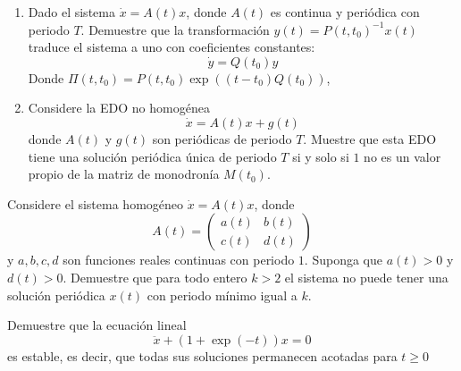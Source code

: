 \documentclass{homework}
\begin{document}
\begin{sol}
    
\end{sol}

\begin{prob}
    \begin{enumerate}[label=(\alph*)]
        \item Dado el sistema \(\dot{x}=A(t)x\), donde \(A(t)\) es continua y periódica con periodo \(T\). Demuestre que la transformación \(y(t)=P(t,t_0)^{-1}x(t)\) traduce el sistema a uno con coeficientes constantes:
        \[\dot{y}=Q(t_0)y\]
        Donde \(\Pi(t,t_0)=P(t,t_0)\exp((t-t_0)Q(t_0))\), 
        \item Considere la EDO no homogénea
        \[\dot{x}=A(t)x+g(t)\]
        donde \(A(t)\) y \(g(t)\) son periódicas de periodo \(T\). Muestre que esta EDO tiene una solución periódica única de periodo \(T\) si y solo si \(1\) no es un valor propio de la matriz de monodronía \(M(t_0)\).
    \end{enumerate}
\end{prob}

\begin{sol}
    
\end{sol}

\begin{prob}
    Considere el sistema homogéneo \(\dot{x}=A(t)x\), donde
    \[A(t)=\begin{pmatrix}
        a(t)&b(t)\\c(t)&d(t)
    \end{pmatrix}\]
    y \(a,b,c,d\) son funciones reales continuas con periodo \(1\). Suponga que \(a(t)>0\) y \(d(t)>0\). Demuestre que para todo entero \(k>2\) el sistema no puede tener una solución periódica \(x(t)\) con periodo mínimo igual a \(k\).
\end{prob}

\begin{sol}
    
\end{sol}

\begin{prob}
    Demuestre que la ecuación lineal
    \[\ddot{x}+(1+\exp(-t))x=0\]
    es estable, es decir, que todas sus soluciones permanecen acotadas para \(t\geq0\)
\end{prob}

\begin{sol}
    
\end{sol}
\end{document}
